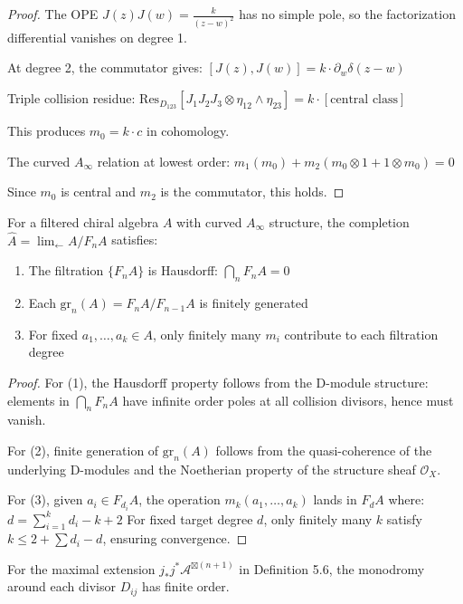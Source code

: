 \begin{proof}
The OPE $J(z)J(w) = \frac{k}{(z-w)^2}$ has no simple pole, so the factorization differential vanishes on degree 1.

At degree 2, the commutator gives:
$[J(z), J(w)] = k \cdot \partial_w\delta(z-w)$

Triple collision residue:
$\text{Res}_{D_{123}}[J_1 J_2 J_3 \otimes \eta_{12} \wedge \eta_{23}] = k \cdot [\text{central class}]$

This produces $m_0 = k \cdot c$ in cohomology.

The curved $A_\infty$ relation at lowest order:
$m_1(m_0) + m_2(m_0 \otimes 1 + 1 \otimes m_0) = 0$

Since $m_0$ is central and $m_2$ is the commutator, this holds.
\end{proof}

\begin{proposition}\label{prop:curved-convergence}
For a filtered chiral algebra $A$ with curved $A_\infty$ structure, the completion $\hat{A} = \lim_{\leftarrow} A/F_nA$ satisfies:
\begin{enumerate}
\item The filtration $\{F_nA\}$ is Hausdorff: $\bigcap_n F_nA = 0$
\item Each $\text{gr}_n(A) = F_nA/F_{n-1}A$ is finitely generated
\item For fixed $a_1, \ldots, a_k \in A$, only finitely many $m_i$ contribute to each filtration degree
\end{enumerate}
\end{proposition}

\begin{proof}
For (1), the Hausdorff property follows from the D-module structure: elements in $\bigcap_n F_nA$ have infinite order poles at all collision divisors, hence must vanish.

For (2), finite generation of $\text{gr}_n(A)$ follows from the quasi-coherence of the underlying D-modules and the Noetherian property of the structure sheaf $\mathcal{O}_X$.

For (3), given $a_i \in F_{d_i}A$, the operation $m_k(a_1, \ldots, a_k)$ lands in $F_d A$ where:
$d = \sum_{i=1}^k d_i - k + 2$
For fixed target degree $d$, only finitely many $k$ satisfy $k \leq 2 + \sum d_i - d$, ensuring convergence.
\end{proof}

\begin{theorem}\label{thm:monodromy-finite}
For the maximal extension $j_*j^*\mathcal{A}^{\boxtimes(n+1)}$ in Definition 5.6, the monodromy around each divisor $D_{ij}$ has finite order.
\end{theorem}

